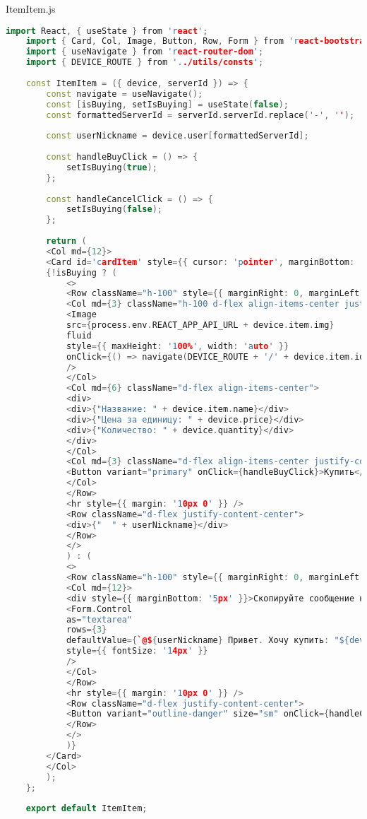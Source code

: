 ItemItem.js
\begin{lstlisting}[language=C++]
	import React, { useState } from 'react';
	import { Card, Col, Image, Button, Row, Form } from 'react-bootstrap';
	import { useNavigate } from 'react-router-dom';
	import { DEVICE_ROUTE } from '../utils/consts';
	
	const ItemItem = ({ device, serverId }) => {
		const navigate = useNavigate();
		const [isBuying, setIsBuying] = useState(false);
		const formattedServerId = serverId.serverId.replace('-', '');
		
		const userNickname = device.user[formattedServerId];
		
		const handleBuyClick = () => {
			setIsBuying(true);
		};
		
		const handleCancelClick = () => {
			setIsBuying(false);
		};
		
		return (
		<Col md={12}>
		<Card id='cardItem' style={{ cursor: 'pointer', marginBottom: '10px', padding: '10px', fontSize: '14px' }} border="light">
		{!isBuying ? (
			<>
			<Row className="h-100" style={{ marginRight: 0, marginLeft: 0 }}>
			<Col md={3} className="h-100 d-flex align-items-center justify-content-center" style={{ paddingRight: 0, paddingLeft: 0 }}>
			<Image
			src={process.env.REACT_APP_API_URL + device.item.img}
			fluid
			style={{ maxHeight: '100%', width: 'auto' }}
			onClick={() => navigate(DEVICE_ROUTE + '/' + device.item.id)}
			/>
			</Col>
			<Col md={6} className="d-flex align-items-center">
			<div>
			<div>{"Название: " + device.item.name}</div>
			<div>{"Цена за единицу: " + device.price}</div>
			<div>{"Количество: " + device.quantity}</div>
			</div>
			</Col>
			<Col md={3} className="d-flex align-items-center justify-content-center">
			<Button variant="primary" onClick={handleBuyClick}>Купить</Button>
			</Col>
			</Row>
			<hr style={{ margin: '10px 0' }} />
			<Row className="d-flex justify-content-center">
			<div>{"  " + userNickname}</div>
			</Row>
			</>
			) : (
			<>
			<Row className="h-100" style={{ marginRight: 0, marginLeft: 0 }}>
			<Col md={12}>
			<div style={{ marginBottom: '5px' }}>Скопируйте сообщение ниже:</div>
			<Form.Control
			as="textarea"
			rows={3}
			defaultValue={`@${userNickname} Привет. Хочу купить: "${device.item.name}" за ${device.price} рублей (somarket)`}
			style={{ fontSize: '14px' }}
			/>
			</Col>
			</Row>
			<hr style={{ margin: '10px 0' }} />
			<Row className="d-flex justify-content-center">
			<Button variant="outline-danger" size="sm" onClick={handleCancelClick} style={{ width: 'auto', margin: '5 auto' }}>Закрыть</Button>
			</Row>
			</>
			)}
		</Card>
		</Col>
		);
	};
	
	export default ItemItem;
\end{lstlisting}

